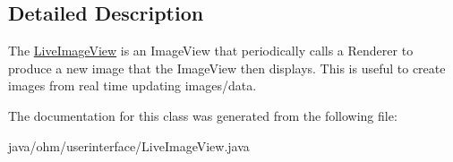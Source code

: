 \subsection{Detailed Description}
The \hyperlink{classohm_1_1userinterface_1_1_live_image_view}{Live\+Image\+View} is an Image\+View that periodically calls a Renderer to produce a new image that the Image\+View then displays. This is useful to create images from real time updating images/data. 

The documentation for this class was generated from the following file\+:\begin{DoxyCompactItemize}
\item 
java/ohm/userinterface/Live\+Image\+View.\+java\end{DoxyCompactItemize}
